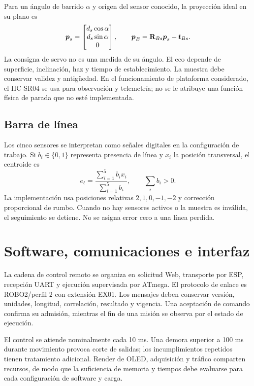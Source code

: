 Para un ángulo de barrido $\alpha$ y origen del sensor conocido, la proyección ideal en su plano es
\begin{equation}
\boldsymbol{p}_s=\begin{bmatrix}d_s\cos\alpha\\d_s\sin\alpha\\0\end{bmatrix},
\qquad \boldsymbol{p}_B=\mathbf{R}_{Bs}\boldsymbol{p}_s+\boldsymbol{t}_{Bs}.
\end{equation}
La consigna de servo no es una medida de su ángulo. El eco depende de superficie, inclinación, haz y tiempo de establecimiento. La muestra debe conservar validez y antigüedad. En el funcionamiento de plataforma considerado, el HC-SR04 se usa para observación y telemetría; no se le atribuye una función física de parada que no esté implementada.

\subsection{Barra de línea}
Los cinco sensores se interpretan como señales digitales en la configuración de trabajo. Si $b_i\in\{0,1\}$ representa presencia de línea y $x_i$ la posición transversal, el centroide es
\begin{equation}
e_{\ell}=\frac{\sum_{i=1}^5 b_i x_i}{\sum_{i=1}^5b_i},
\qquad \sum_i b_i>0.
\end{equation}
La implementación usa posiciones relativas $2,1,0,-1,-2$ y corrección proporcional de rumbo. Cuando no hay sensores activos o la muestra es inválida, el seguimiento se detiene. No se asigna error cero a una línea perdida.

\section{Software, comunicaciones e interfaz}
La cadena de control remoto se organiza en solicitud Web, transporte por ESP, recepción UART y ejecución supervisada por ATmega. El protocolo de enlace es ROBO2/perfil 2 con extensión EX01. Los mensajes deben conservar versión, unidades, longitud, correlación, resultado y vigencia. Una aceptación de comando confirma su admisión, mientras el fin de una misión se observa por el estado de ejecución.

El control se atiende nominalmente cada 10 ms. Una demora superior a 100 ms durante movimiento provoca corte de salidas; los incumplimientos repetidos tienen tratamiento adicional. Render de OLED, adquisición y tráfico comparten recursos, de modo que la suficiencia de memoria y tiempos debe evaluarse para cada configuración de software y carga.

